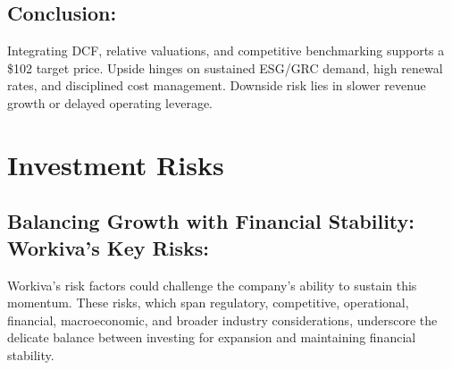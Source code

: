 \documentclass[
  10pt,
  a4paper,
]{article}
\begin{document}
\subsection{Conclusion:}\label{conclusion}

Integrating DCF, relative valuations, and competitive benchmarking
supports a \$102 target price. Upside hinges on sustained ESG/GRC
demand, high renewal rates, and disciplined cost management. Downside
risk lies in slower revenue growth or delayed operating leverage.

\section{Investment Risks}\label{investment-risks}

\subsection{Balancing Growth with Financial Stability: Workiva's Key
Risks:}\label{balancing-growth-with-financial-stability-workivas-key-risks}

Workiva's risk factors could challenge the company's ability to sustain
this momentum. These risks, which span regulatory, competitive,
operational, financial, macroeconomic, and broader industry
considerations, underscore the delicate balance between investing for
expansion and maintaining financial stability.
\end{document}
